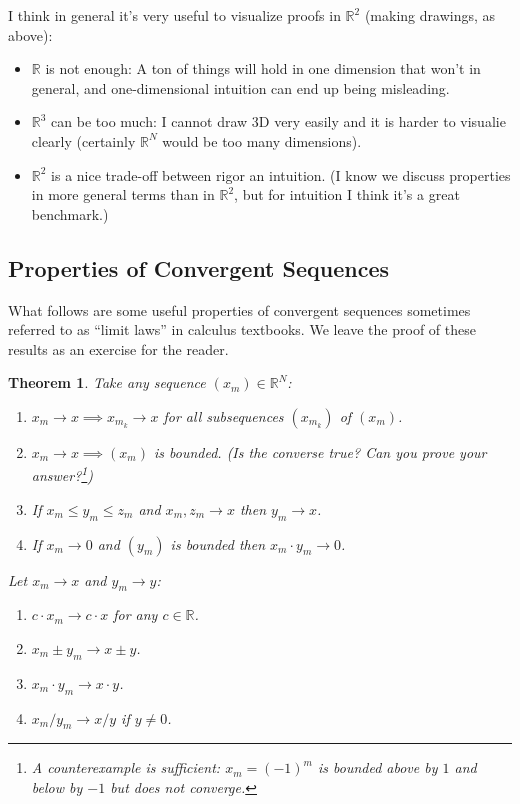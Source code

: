\documentclass{article}
\newcommand{\R}{\mathbb{R}}
\newtheorem{theorem}{Theorem}
\theoremstyle{definition}
\begin{document}
I think in general it's very useful to visualize proofs in $\mathbb{R}^2$ (making drawings, as above):
\begin{itemize}
  \item $\R$ is not enough: A ton of things will hold in one dimension that won't in general, and one-dimensional intuition can end up being misleading.

  \item $\R^3$ can be too much: I cannot draw 3D very easily and it is harder to visualie clearly (certainly $\R^N$ would be too many dimensions).

  \item $\R^2$ is a nice trade-off between rigor an intuition.  (I know we discuss properties in more general terms than in $\R^2$, but for intuition I think it's a great benchmark.)
\end{itemize}


\subsection{Properties of Convergent Sequences}
\label{ssub:properties_of_convergent_sequences}
What follows are some useful properties of convergent sequences sometimes referred to as ``limit laws'' in calculus textbooks. We leave the proof of these results as an exercise for the reader. 
\begin{theorem}
  Take any sequence $(x_m) \in \mathbb{R}^N$:
  \begin{enumerate}
    \item[a)] $x_m \to x \implies x_{m_k} \to x$ for all subsequences $(x_{m_k})$ of $(x_m)$.

    \item[b)] $x_m \to x \implies (x_m)$ is bounded. (Is the converse true? Can you prove your answer?\footnote{A counterexample is sufficient: $x_m = (-1)^m$ is bounded above by $1$ and below by $-1$ but does not converge.})

    \item[c)] If $x_m \le y_m \le z_m$ and $x_m, z_m \to x$ then $y_m \to x$.

    \item[d)] If $x_m \to 0$ and $(y_m)$ is bounded then $x_m \cdot y_m \to 0$.
  \end{enumerate}

  Let $x_m \to x$ and $y_m \to y$:
  \begin{enumerate}
    \item[e)] $c \cdot x_m \to c \cdot x$ for any $c \in \mathbb{R}$.

    \item[f)] $x_m \pm y_m \to x \pm y$.

    \item[g)] $x_m \cdot y_m \to x \cdot y$.

    \item[h)] $x_m / y_m \to x / y$ if $y \ne 0$.
  \end{enumerate}
\end{theorem}
\end{document}
